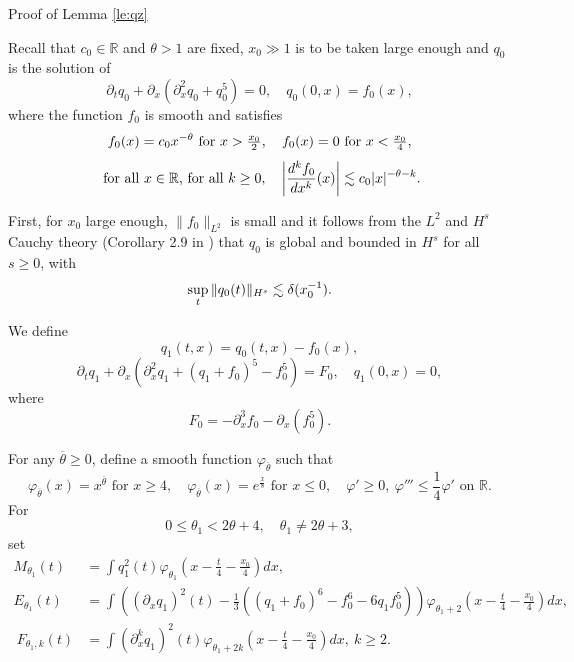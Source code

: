 \documentclass[11pt,a4paper,reqno]{amsart}
\makeatletter
\theoremstyle{remark}
\numberwithin{equation}{section}
\def\section{\@startsection{section}{1}%
  \z@{1.5\linespacing\@plus\linespacing}{.5\linespacing}%
  {\normalfont\bfseries\large\centering}}
\newcommand{\be}{\begin{equation}}
\newcommand{\ee}{\end{equation}}
\def\RR{\mathbb{R}}
\def\RR{\mathbb{R}}
\def\bar#1{{\overline #1}}
\def\sup{\mathop{\rm sup}}
\def\qz{q_0}
\def\qu{q_1}
\makeatother
\begin{document}
  



\appendix
\section{Proof of Lemma \ref{le:qz}}\label{AA}

Recall that  $c_0\in \RR$ and $\theta>1$ are  fixed,  $x_0\gg 1$ is to be taken large enough and $\qz$ is the solution of 
\be\label{defqzA}
\partial_t \qz + \partial_x(\partial_x^2 \qz + \qz^5)=0,\quad
\qz(0,x)= f_0(x),
\ee
where the function $f_0$ is   smooth and satisfies
\be\label{deffzA}
f_0(x)= c_0 x^{-\theta} \hbox{ for $x>\frac {x_0}2$},\quad
f_0(x)=0 \hbox{ for $x<\frac {x_0}4$}, 
\ee
\be\label{estfzA}
\hbox{ for all $x\in \RR$, for all $k\geq 0$},\quad 
\left|\frac {d^{k}f_0}{dx^k} (x)\right| \lesssim c_0 |x|^{-\theta - k}.
\ee

First, for $x_0$ large enough, $\|f_0\|_{L^2}$ is small and it follows from the $L^2$ and $H^s$ Cauchy theory (Corollary 2.9 in \cite{KPV})
that $q_0$ is global and bounded in $H^s$ for all $s\geq 0$, with
$$\sup_t\|q_0(t)\|_{H^s}\lesssim \delta(x_0^{-1}).$$
 

We define
$$
\qu(t,x)  = \qz(t,x) -f_0(x),
$$
\be\label{defquA}
\partial_t \qu + \partial_x(\partial_x^2 \qu + (\qu+f_0)^5-f_0^5)=F_0,\quad
\qu(0,x)= 0, 
\ee
where
$$
F_0 = -\partial_x^3 f_0 - \partial_x(f_0^5).
$$

For any $\bar \theta\geq 0$, define a smooth function $\varphi_{\bar \theta}$ such that
\begin{equation}\label{dfphiu}
\varphi_{\bar \theta}(x) = x^{\bar \theta}  \text{ for $x\geq 4$},\quad
\varphi_{\bar \theta}(x) =  e^{\frac x8}   \text{ for $x\leq 0$},\quad
\varphi'\geq 0,\  \varphi'''\leq \frac 14 \varphi' \text{ on $\RR$}.
\end{equation}
For 
$$
0\leq \theta_1< 2 \theta+4, \quad \theta_1 \neq 2 \theta+3,
$$
    set
\begin{align*}
M_{\theta_1}(t)& = \int q_1^2(t) \varphi_{\theta_1}\left( x - \frac t 4 - \frac {x_0} 4\right) dx,
\\
E_{\theta_1}(t) &= \int \left( (\partial_x q_1)^2(t) -\frac 13 \left( (q_1+f_0)^6 - f_0^6 - 6 q_1 f_0^5\right)   \right)\varphi_{\theta_1+2}\left( x - \frac t 4 - \frac {x_0} 4 \right) dx,\\\
F_{\theta_1,k}(t) &= \int (\partial_x^k q_1)^2(t) \varphi_{\theta_1+2k}\left( x - \frac t 4 - \frac {x_0} 4\right) dx, \ k\geq 2.
\end{align*}
\end{document}
